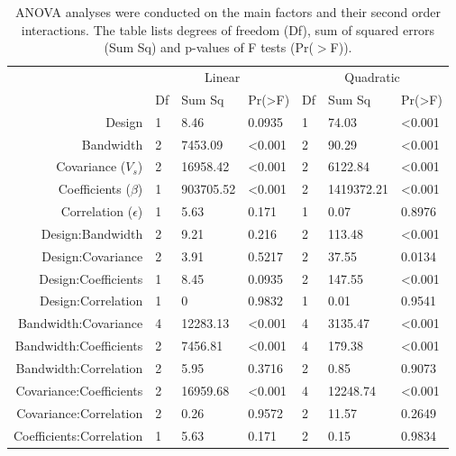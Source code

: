 \documentclass[a4paper]{article} 	%
\begin{document}
\begin{table}[!htp]
	\centering
	\caption{ANOVA analyses were conducted on the main factors and their second order interactions. The table lists degrees of freedom (Df), sum of squared errors (Sum Sq) and p-values of F tests (Pr($>$F)). }\label{tb:LMMoutput}
	\begin{tabular}{r | lll | lll}
		\toprule
		 & \multicolumn{3}{c|}{Linear}  & \multicolumn{3}{c}{Quadratic}  \\
    & Df & Sum Sq  & Pr(\textgreater{}F) & Df & Sum Sq  & Pr(\textgreater{}F) \\ \midrule 
Design & 1  & 8.46  & 0.0935  & 1  & 74.03 & \textless{}0.001  \\
Bandwidth & 2  & 7453.09 & \textless{}0.001  & 2  & 90.29  & \textless{}0.001  \\
Covariance ($V_s$)  & 2  & 16958.42  & \textless{}0.001  & 2  & 6122.84 & \textless{}0.001 \\
Coefficients ($\beta$)  & 1  & 903705.52 & \textless{}0.001  & 2  & 1419372.21 & \textless{}0.001  \\
Correlation  ($\epsilon$)  & 1  & 5.63  & 0.171   & 1  & 0.07  & 0.8976  \\
Design:Bandwidth  & 2  & 9.21 & 0.216  & 2  & 113.48   & \textless{}0.001  \\
Design:Covariance & 2  & 3.91 & 0.5217  & 2  & 37.55  & 0.0134 \\
Design:Coefficients  & 1  & 8.45 & 0.0935  & 2  & 147.55 & \textless{}0.001  \\
Design:Correlation  & 1  & 0  & 0.9832  & 1  & 0.01  & 0.9541  \\
Bandwidth:Covariance   & 4  & 12283.13  & \textless{}0.001  & 4  & 3135.47  & \textless{}0.001  \\
Bandwidth:Coefficients & 2  & 7456.81 & \textless{}0.001  & 4  & 179.38 & \textless{}0.001  \\
Bandwidth:Correlation  & 2  & 5.95  & 0.3716  & 2  & 0.85  & 0.9073  \\
Covariance:Coefficients  & 2  & 16959.68  & \textless{}0.001  & 4  & 12248.74 & \textless{}0.001  \\
Covariance:Correlation & 2  & 0.26  & 0.9572  & 2  & 11.57  & 0.2649  \\
Coefficients:Correlation & 1  & 5.63  & 0.171   & 2  & 0.15  & 0.9834  \\ \bottomrule  
	\end{tabular}
\end{table}
\end{document}
